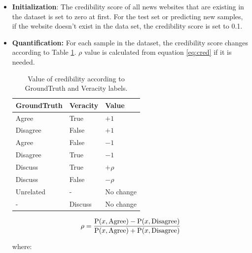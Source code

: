 \begin{itemize}
	\item \textbf{Initialization}: The credibility score of all news websites that are existing in the \cite{stance_persian} dataset is set to zero at first. For the test set or predicting new samples, if the website doesn't exist in the data set, the credibility score is set to 0.1.


	\item \textbf{Quantification:}
	For each sample in the dataset, the credibility score changes according to Table \ref{tbl:cred}. $\rho$ value is calculated from equation \ref{eq:cred} if it is needed.
	\begin{table}[H]
		\centering
		\caption{Value of credibility according to GroundTruth and Veracity labels. }
		\setlength{\extrarowheight}{5pt}%
		\begin{tabular}{|l|l|l|}
			\hline
			GroundTruth & Veracity & Value \\
			\hline \hline
			Agree       & True     & $+1$    \\
			\hline
			Disagree    & False    & $+1$    \\
			\hline
			Agree       & False    & $-1$    \\
			\hline
			Disagree    & True     & $-1$    \\
			\hline
			Discuss     & True     & $+\rho$    \\
			\hline
			Discuss     & False    & $-\rho$   \\
			\hline
			Unrelated     & -   & No change   \\
			\hline
			-     & Discuss    & No change   \\
			\hline
		\end{tabular}
		\label{tbl:cred}
	\end{table}

	\begin{equation}
	\label{eq:cred}
	\rho = \frac{\text{P}(x,\text{Agree}) - \text{P}(x,\text{Disagree})}{\text{P}(x,\text{Agree}) + \text{P}(x,\text{Disagree})}\\
	\end{equation}

where: 
	

\end{itemize}
